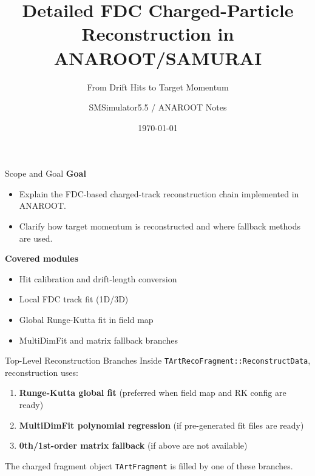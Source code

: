 \documentclass[aspectratio=169]{beamer}
\title[FDC Reconstruction in ANAROOT]{Detailed FDC Charged-Particle Reconstruction in ANAROOT/SAMURAI}
\subtitle{From Drift Hits to Target Momentum}
\author{SMSimulator5.5 / ANAROOT Notes}
\date{\today}
\begin{document}
\begin{frame}
\titlepage
\end{frame}

\begin{frame}{Scope and Goal}
\textbf{Goal}
\begin{itemize}
\item Explain the FDC-based charged-track reconstruction chain implemented in ANAROOT.
\item Clarify how target momentum is reconstructed and where fallback methods are used.
\end{itemize}

\vspace{0.2cm}
\textbf{Covered modules}
\begin{itemize}
\item Hit calibration and drift-length conversion
\item Local FDC track fit (1D/3D)
\item Global Runge-Kutta fit in field map
\item MultiDimFit and matrix fallback branches
\end{itemize}
\end{frame}

\begin{frame}{Top-Level Reconstruction Branches}
Inside \texttt{TArtRecoFragment::ReconstructData}, reconstruction uses:
\begin{enumerate}
\item \textbf{Runge-Kutta global fit} (preferred when field map and RK config are ready)
\item \textbf{MultiDimFit polynomial regression} (if pre-generated fit files are ready)
\item \textbf{0th/1st-order matrix fallback} (if above are not available)
\end{enumerate}

\vspace{0.2cm}
The charged fragment object \texttt{TArtFragment} is filled by one of these branches.
\end{frame}
\end{document}
